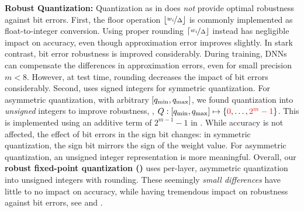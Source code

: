\textbf{Robust Quantization:} Quantization as in  does \emph{not} provide optimal robustness against bit errors. First, the floor operation $\lfloor \nicefrac{w_i}{\Delta}\rfloor$ is commonly implemented as float-to-integer conversion. Using proper rounding $\lceil\nicefrac{w_i}{\Delta}\rfloor$ instead has negligible impact on accuracy, even though approximation error improves slightly. In stark contrast, bit error robustness is improved considerably. During training, DNNs can compensate the differences in approximation errors, even for small precision $m < 8$. However, at test time,
rounding decreases the impact of bit errors considerably. Second,  uses signed integers for symmetric quantization. For asymmetric quantization, with arbitrary $[\qmin, \qmax]$, we found quantization into \emph{unsigned} integers to improve robustness, \ie, $Q : [\qmin, \qmax] \mapsto \{{\color{red}0}, \ldots, {\color{red}2^m - 1}\}$. This is implemented using an additive term of $2^{m-1}-1$ in . While accuracy is not affected, the effect of bit errors in the sign bit changes: in symmetric quantization, the sign bit mirrors the sign of the weight value. For asymmetric quantization, an unsigned integer representation is more meaningful. Overall, our \textbf{robust fixed-point quantization (\Quant)}  uses per-layer, asymmetric quantization into unsigned integers with rounding.
These seemingly \emph{small differences} have little to no impact on accuracy, while having tremendous impact on robustness against bit errors, see  and . 


